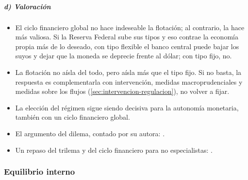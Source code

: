 \documentclass[11pt]{article}
\begin{document}
\subparagraph{d) Valoración}

\begin{itemize}
\item El ciclo financiero global no hace indeseable la flotación; al contrario, la hace más valiosa. Si la Reserva Federal sube sus tipos y eso contrae la economía propia más de lo deseado, con tipo flexible el banco central puede bajar los suyos y dejar que la moneda se deprecie frente al dólar; con tipo fijo, no.
\item La flotación no aísla del todo, pero aísla más que el tipo fijo. Si no basta, la respuesta es complementarla con intervención, medidas macroprudenciales y medidas sobre los flujos (\ref{sec:intervencion-regulacion}), no volver a fijar.
\item La elección del régimen sigue siendo decisiva para la autonomía monetaria, también con un ciclo financiero global.
\end{itemize}

\begin{anotaciones}
\begin{itemize}
\item El argumento del dilema, contado por su autora: \textcite{Rey2013VoxEU}.
\item Un repaso del trilema y del ciclo financiero para no especialistas: \textcite{Economist2016Trilema}.
\end{itemize}
\end{anotaciones}

\subsubsection{Equilibrio interno}\label{sec:equilibrio-interno}
\end{document}
